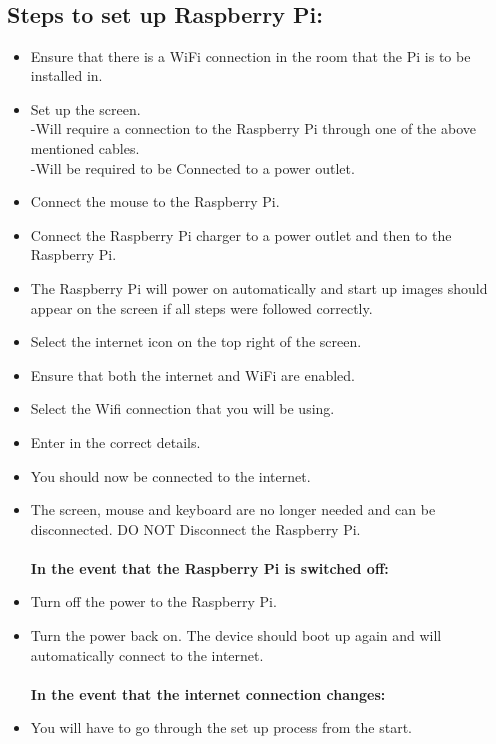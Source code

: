 	\subsection*{\\Steps to set up Raspberry Pi:\\}
		\begin{itemize}
			\item Ensure that there is a WiFi connection in the room that the Pi is to be installed in.
			\item Set up the screen.\\ -Will require a connection to the Raspberry Pi through one of the above mentioned cables.\\-Will be required to be Connected to a power outlet.
			\item Connect the mouse to the Raspberry Pi.
			\item Connect the Raspberry Pi charger to a power outlet and then to the Raspberry Pi.
			\item The Raspberry Pi will power on automatically and start up images should appear on the screen if all steps were followed correctly.
			\item Select the internet icon on the top right of the screen.
			\item Ensure that both the internet and WiFi are enabled.
			\item Select the Wifi connection that you will be using.
			\item Enter in the correct details.
			\item You should now be connected to the internet.
			\item The screen, mouse and keyboard are no longer needed and can be disconnected. DO NOT Disconnect the Raspberry Pi.
			\textbf{\\\\In the event that the Raspberry Pi is switched off: }
			
			\item Turn off the power to the Raspberry Pi.
			\item Turn the power back on. The device should boot up again and will automatically connect to the internet.
			\textbf{\\\\In the event that the internet connection changes: }
			\item You will have to go through the set up process from the start.
		\end{itemize}


